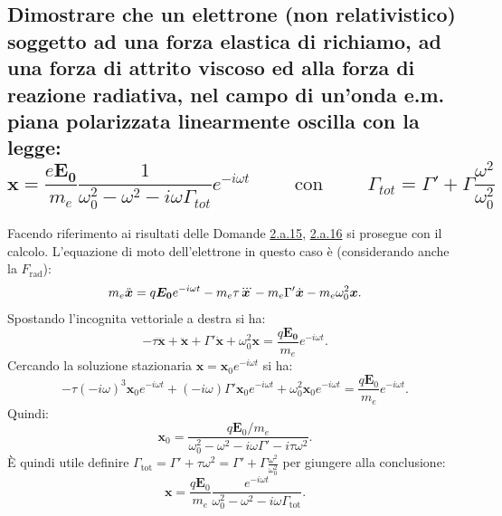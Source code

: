 \subsection[\hspace{2mm} Oscillazione dell'elettrone con forze di richiamo, viscosa, radiativa nel campo di un'onda E.M.]{Dimostrare che un elettrone (non relativistico) soggetto ad una forza elastica di richiamo, ad una forza di attrito viscoso ed alla forza di reazione radiativa, nel campo di un’onda e.m. piana polarizzata linearmente oscilla con la legge:
\[
	\boldsymbol{x} = \frac{e \boldsymbol{E_0}}{m_{e}} \frac{1}{\omega_0^2-\omega^2-i\omega\Gamma_{tot}} e^{-i \omega t} \quad \quad 
	\text{ con }  \quad \quad
	\Gamma_{tot} = \Gamma' + \Gamma \frac{\omega^2}{\omega_{0}^2}
\] 
} \label{subsec: 2.b.12}
Facendo riferimento ai risultati delle Domande \hyperref[subsec: 2.a.15]{2.a.15}, \hyperref[subsec: 2.a.16]{2.a.16}  si prosegue con il calcolo.
L'equazione di moto dell'elettrone in questo caso è (considerando anche la $F_{\text{rad}}$):
\[
m_e \ddot{\boldsymbol{x}} = q \boldsymbol{E_0}e^{-i \omega t} - m_e \tau \dddot{\boldsymbol{x}} - m_e \Gamma' \dot{\boldsymbol{x}} - m_e\omega_0^2 \boldsymbol{x}
.\] 
Spostando l'incognita vettoriale a destra si ha:
\[
-\tau \dddot{\boldsymbol{x}} + \ddot{\boldsymbol{x}} + \Gamma' \dot{\boldsymbol{x}} + \omega _0^2 \boldsymbol{x} = \frac{q \boldsymbol{E_0}}{m_e} e^{-i \omega t}
.\] 
Cercando la soluzione stazionaria $\boldsymbol{x} = \boldsymbol{x}_0 e^{-i \omega t}$ si ha:
\[
	-\tau \left( -i \omega \right)^3 \boldsymbol{x}_0e^{-i \omega t} + \left( - i \omega \right) \Gamma'\boldsymbol{x}_0 e^{-i \omega t} + \omega _0^2 \boldsymbol{x}_0 e^{-i \omega t} = \frac{q \boldsymbol{E}_0}{m_e} e^{-i \omega t}
.\] 
Quindi:
\[
\boldsymbol{x}_0 = \frac{q \boldsymbol{E}_0/m_e}{ \omega _0^2 - \omega ^2 -i \omega \Gamma' - i \tau \omega ^2 }
.\]
È quindi utile definire $\Gamma_{\text{tot}} = \Gamma' + \tau \omega ^2 = \Gamma' + \Gamma \frac{\omega ^2}{\omega _0^2}$ per giungere alla conclusione:
\[
\boldsymbol{x} = \frac{q \boldsymbol{E}_0}{m_e} \frac{e^{-i \omega t}}{\omega _0^2 - \omega ^2 - i \omega \Gamma_{\text{tot}}} 
.\] 

